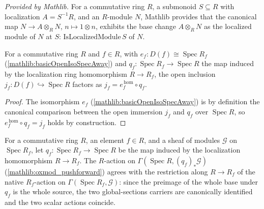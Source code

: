\begin{lemma}
  \label{mathlib:tensorProduct_isLocalizedModule}
  \mathlibok
  \textit{Provided by Mathlib.}
  For a commutative ring \(R\), a submonoid \(S\subseteq R\) with localization
  \(A=S^{-1}R\), and an \(R\)-module \(N\), Mathlib provides that the canonical map
  \(N\to A\otimes_R N\), \(n\mapsto 1\otimes n\), exhibits the base change
  \(A\otimes_R N\) as the localized module of \(N\) at \(S\):
  \(\mathrm{IsLocalizedModule}\,S\) of \(N\).
\end{lemma}


\begin{lemma}
  \label{found:basicOpenIso_hom_specMap}
  \leanok
  For a commutative ring \(R\) and \(f\in R\), with \(e_f:D(f)\cong\operatorname{Spec}
  R_f\) (\cref{mathlib:basicOpenIsoSpecAway}) and \(q_f:\operatorname{Spec}R_f\to
  \operatorname{Spec}R\) the map induced by the localization ring homomorphism
  \(R\to R_f\), the open inclusion \(j_f:D(f)\hookrightarrow\operatorname{Spec}R\)
  factors as \(j_f=e_f^{\,\mathrm{hom}}\circ q_f\).
\end{lemma}

\begin{proof}
  \leanok
  The isomorphism \(e_f\) (\cref{mathlib:basicOpenIsoSpecAway}) is by definition the
  canonical comparison between the open immersion \(j_f\) and \(q_f\) over
  \(\operatorname{Spec}R\), so \(e_f^{\,\mathrm{hom}}\circ q_f=j_f\) holds by
  construction.
\end{proof}

\begin{lemma}
  \label{found:pushforward_smul_coherence}
  For a commutative ring \(R\), an element \(f\in R\), and a sheaf of modules
  \(\mathcal G\) on \(\operatorname{Spec}R_f\), let
  \(q_f:\operatorname{Spec}R_f\to\operatorname{Spec}R\) be the map induced by the
  localization homomorphism \(R\to R_f\).  The \(R\)-action on
  \(\Gamma(\operatorname{Spec}R,(q_f)_{*}\mathcal G)\) (\cref{mathlib:oxmod_pushforward})
  agrees with the restriction along \(R\to R_f\) of the native \(R_f\)-action on
  \(\Gamma(\operatorname{Spec}R_f,\mathcal G)\): since the preimage of the whole base
  under \(q_f\) is the whole source, the two global-sections carriers are canonically
  identified and the two scalar actions coincide.
\end{lemma}

